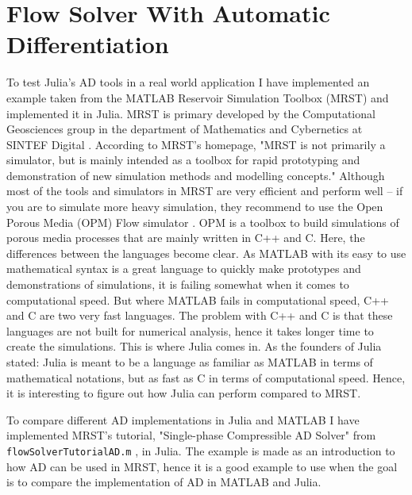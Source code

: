 \chapter{Flow Solver With Automatic Differentiation}
\label{ch:FlowSolver}
To test Julia's AD tools in a real world application I have implemented an example taken from the MATLAB Reservoir Simulation Toolbox (MRST) and implemented it in Julia. MRST is primary developed by the Computational Geosciences group in the department of Mathematics and Cybernetics at SINTEF Digital \emph{\citep{mrstHomepage}}. According to MRST's homepage, "MRST is not primarily a simulator, but is mainly intended as a toolbox for rapid prototyping and demonstration of new simulation methods and modelling concepts." Although most of the tools and simulators in MRST are very efficient and perform well -- if you are to simulate more heavy simulation, they recommend to use the Open Porous Media (OPM) Flow simulator \emph{\citep{OPM}}. OPM is a toolbox to build simulations of porous media processes that are mainly written in C++ and C. Here, the differences between the languages become clear. As MATLAB with its easy to use mathematical syntax is a great language to quickly make prototypes and demonstrations of simulations, it is failing somewhat when it comes to computational speed. But where MATLAB fails in computational speed, C++ and C are two very fast languages. The problem with C++ and C is that these languages are not built for numerical analysis, hence it takes longer time to create the simulations. This is where Julia comes in. As the founders of Julia stated: Julia is meant to be a language as familiar as MATLAB in terms of mathematical notations, but as fast as C in terms of computational speed. Hence, it is interesting to figure out how Julia can perform compared to MRST.

To compare different AD implementations in Julia and MATLAB I have implemented MRST's tutorial, "Single-phase Compressible AD Solver" from \texttt{flowSolverTutorialAD.m} \emph{\citep{flowSolverADExample}}, in Julia. The example is made as an introduction to how AD can be used in MRST, hence it is a good example to use when the goal is to compare the implementation of AD in MATLAB and Julia. 

